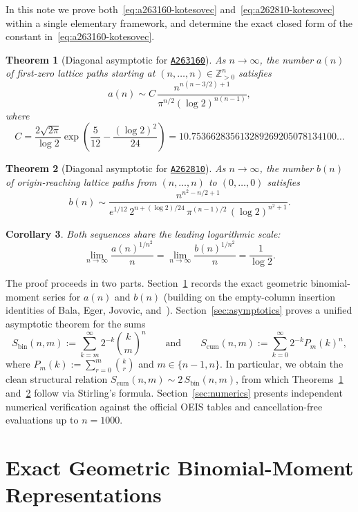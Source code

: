 \documentclass[11pt,a4paper]{article}
\newtheorem{theorem}{Theorem}
\newtheorem{corollary}[theorem]{Corollary}
\theoremstyle{remark}
\newcommand{\oeis}[1]{\href{https://oeis.org/#1}{\texttt{#1}}}
\begin{document}
In this note we prove both~\eqref{eq:a263160-kotesovec} and~\eqref{eq:a262810-kotesovec} within a single elementary framework, and determine the exact closed form of the constant in~\eqref{eq:a263160-kotesovec}.

\begin{theorem}[Diagonal asymptotic for \oeis{A263160}]\label{thm:a263160}
As $n\to\infty$, the number $a(n)$ of first-zero lattice paths starting at $(n,\dots,n)\in\mathbb{Z}_{>0}^n$ satisfies
\[
  a(n) \sim C\,\frac{n^{n(n-3/2)+1}}{\pi^{n/2}(\log 2)^{n(n-1)}},
\]
where
\[
  C = \frac{2\sqrt{2\pi}}{\log 2}\exp\!\left(\frac{5}{12}-\frac{(\log 2)^2}{24}\right)
    = 10.753662835613289269205078134100\ldots
\]
\end{theorem}

\begin{theorem}[Diagonal asymptotic for \oeis{A262810}]\label{thm:a262810}
As $n\to\infty$, the number $b(n)$ of origin-reaching lattice paths from $(n,\dots,n)$ to $(0,\dots,0)$ satisfies
\[
  b(n) \sim \frac{n^{n^2 - n/2 + 1}}{e^{1/12}\,2^{n + (\log 2)/24}\,\pi^{(n-1)/2}\,(\log 2)^{n^2+1}}.
\]
\end{theorem}

\begin{corollary}\label{cor:root-limit}
Both sequences share the leading logarithmic scale:
\[
  \lim_{n\to\infty}\frac{a(n)^{1/n^2}}{n}
  = \lim_{n\to\infty}\frac{b(n)^{1/n^2}}{n}
  = \frac{1}{\log 2}.
\]
\end{corollary}

The proof proceeds in two parts. Section~\ref{sec:series} records the exact geometric binomial-moment series for $a(n)$ and $b(n)$ (building on the empty-column insertion identities of Bala, Eger, Jovovic, and~\cite{Trureturing2026}). Section~\ref{sec:asymptotics} proves a unified asymptotic theorem for the sums
\[
  S_{\mathrm{bin}}(n,m) := \sum_{k=m}^{\infty} 2^{-k}\binom{k}{m}^n
  \qquad\text{and}\qquad
  S_{\mathrm{cum}}(n,m) := \sum_{k=0}^{\infty} 2^{-k}P_m(k)^n,
\]
where $P_m(k) := \sum_{r=0}^{m}\binom{k}{r}$ and $m\in\{n-1,n\}$. In particular, we obtain the clean structural relation $S_{\mathrm{cum}}(n,m) \sim 2\,S_{\mathrm{bin}}(n,m)$, from which Theorems~\ref{thm:a263160} and~\ref{thm:a262810} follow via Stirling's formula. Section~\ref{sec:numerics} presents independent numerical verification against the official OEIS tables and cancellation-free evaluations up to $n=1000$.

\section{Exact Geometric Binomial-Moment Representations}\label{sec:series}
\end{document}
